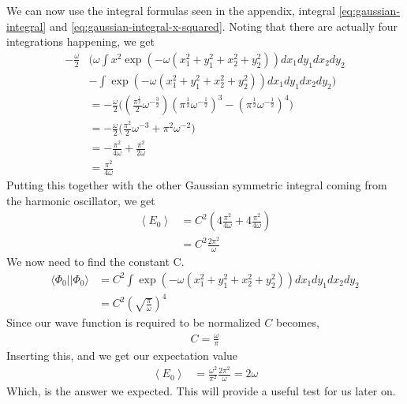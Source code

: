 \documentclass[11pt]{article}
\newcommand{\expect}[1]{\left\langle{#1}\right\rangle}
\newcommand{\bra}[1]{\langle{#1}|}
\newcommand{\ket}[1]{|{#1}\rangle}
\begin{document}
We can now use the integral formulas seen in the appendix, integral \eqref{eq:gaussian-integral} and \eqref{eq:gaussian-integral-x-squared}. Noting that there are actually four integrations happening, we get
\begin{align*}
	-\frac{\omega}{2}&\bigg( \omega \int x^2 \exp \left(-\omega\left(x_1^2 + y_1^2 + x_2^2 + y_2^2\right)\right) dx_1 dy_1 dx_2 dy_2 \\
	&- \int \exp \left(-\omega\left(x_1^2 + y_1^2 + x_2^2 + y_2^2\right)\right) dx_1 dy_1 dx_2 dy_2 \bigg) \\
	&= -\frac{\omega}{2}\bigg( \left(\frac{\pi^\frac{1}{2}}{2}\omega^{-\frac{3}{2}}\right)\left(\pi^\frac{1}{2} \omega^{-\frac{1}{2}}\right)^3 - \left(\pi^\frac{1}{2} \omega^{-\frac{1}{2}}\right)^4\bigg) \\
	&= -\frac{\omega}{2}\bigg( \frac{\pi^2}{2}\omega^{-3} + \pi^2\omega^{-2} \bigg) \\
	&= -\frac{\pi^2}{4\omega} + \frac{\pi^2}{2\omega} \\
	&= \frac{\pi^2}{4\omega}
\end{align*}
Putting this together with the other Gaussian symmetric integral coming from the harmonic oscillator, we get
\begin{align*}
	\expect{E_0} &= C^2\left( 4\frac{\pi^2}{4\omega} + 4\frac{\pi^2}{4\omega} \right) \\
	&= C^2 \frac{2\pi^2}{\omega}
\end{align*}
We now need to find the constant C.
\begin{align*}
	\bra{\Phi_0}\ket{\Phi_0} &= C^2\int\exp \left( -\omega\left(x_1^2 + y_1^2 + x_2^2 + y_2^2\right) \right) dx_1dy_1dx_2dy_2 \\
	&= C^2\left( \sqrt{\frac{\pi}{\omega}} \right)^4
\end{align*}
Since our wave function is required to be normalized $C$ becomes,
\begin{align*}
	C = \frac{\omega}{\pi}
\end{align*}
Inserting this, and we get our expectation value
\begin{align*}
	\expect{E_0} &= \frac{\omega^2}{\pi^2}\frac{2\pi^2}{\omega} = 2\omega
\end{align*}
Which, is the answer we expected. This will provide a useful test for us later on.
\end{document}
